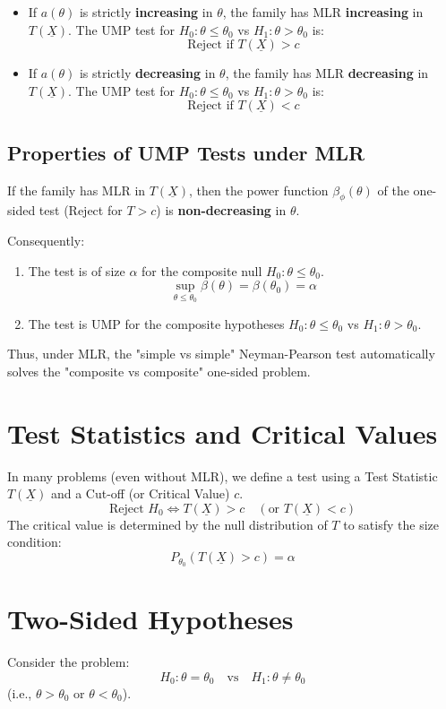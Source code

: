 \documentclass[12pt, a4paper]{article}
\theoremstyle{definition}
\newcommand{\Xvec}{\underline{X}}
\begin{document}
\begin{itemize}
    \item If $a(\theta)$ is strictly \textbf{increasing} in $\theta$, the family has MLR \textbf{increasing} in $T(\Xvec)$.
    The UMP test for $H_0: \theta \le \theta_0$ vs $H_1: \theta > \theta_0$ is:
    $$ \text{Reject if } T(\Xvec) > c $$
    \item If $a(\theta)$ is strictly \textbf{decreasing} in $\theta$, the family has MLR \textbf{decreasing} in $T(\Xvec)$.
    The UMP test for $H_0: \theta \le \theta_0$ vs $H_1: \theta > \theta_0$ is:
    $$ \text{Reject if } T(\Xvec) < c $$
\end{itemize}

\subsection{Properties of UMP Tests under MLR}
If the family has MLR in $T(\Xvec)$, then the power function $\beta_\phi(\theta)$ of the one-sided test (Reject for $T > c$) is \textbf{non-decreasing} in $\theta$.

Consequently:
\begin{enumerate}
    \item The test is of size $\alpha$ for the composite null $H_0: \theta \le \theta_0$.
    $$ \sup_{\theta \le \theta_0} \beta(\theta) = \beta(\theta_0) = \alpha $$
    \item The test is UMP for the composite hypotheses $H_0: \theta \le \theta_0$ vs $H_1: \theta > \theta_0$.
\end{enumerate}
Thus, under MLR, the "simple vs simple" Neyman-Pearson test automatically solves the "composite vs composite" one-sided problem.

\section{Test Statistics and Critical Values}

In many problems (even without MLR), we define a test using a Test Statistic $T(\Xvec)$ and a Cut-off (or Critical Value) $c$.
$$ \text{Reject } H_0 \iff T(\Xvec) > c \quad (\text{or } T(\Xvec) < c) $$
The critical value is determined by the null distribution of $T$ to satisfy the size condition:
$$ P_{\theta_0}(T(\Xvec) > c) = \alpha $$

\section{Two-Sided Hypotheses}
Consider the problem:
$$ H_0: \theta = \theta_0 \quad \text{vs} \quad H_1: \theta \neq \theta_0 $$
(i.e., $\theta > \theta_0$ or $\theta < \theta_0$).
\end{document}

